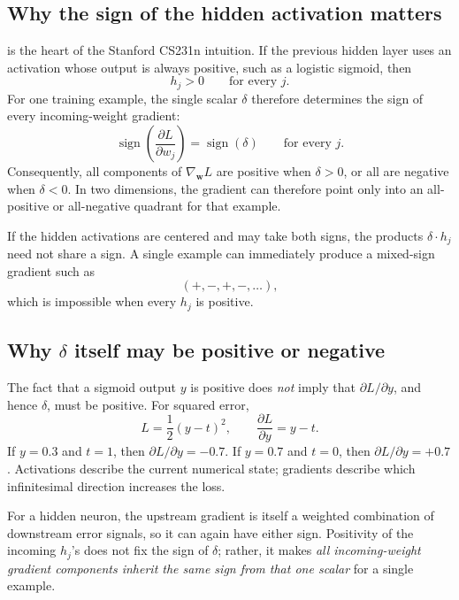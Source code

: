 \documentclass[11pt]{article}
\begin{document}
\subsection{Why the sign of the hidden activation matters}

 is the heart of the Stanford CS231n intuition.  If the previous hidden layer uses an activation whose output is always positive, such as a logistic sigmoid, then
\[
  h_j>0 \qquad \text{for every }j.
\]
For one training example, the single scalar \(\delta\) therefore determines the sign of every incoming-weight gradient:
\begin{equation}
  \operatorname{sign}\!\left(\frac{\partial L}{\partial w_j}\right)
  =\operatorname{sign}(\delta)
  \qquad \text{for every }j.
  \label{eq:samesign}
\end{equation}
Consequently, all components of \(\nabla_{\mathbf w}L\) are positive when \(\delta>0\), or all are negative when \(\delta<0\).  In two dimensions, the gradient can therefore point only into an all-positive or all-negative quadrant for that example.

If the hidden activations are centered and may take both signs, the products \(\delta\cdot h_j\) need not share a sign.  A single example can immediately produce a mixed-sign gradient such as
\[
  (+,-,+,-,\ldots),
\]
which is impossible when every \(h_j\) is positive.

\subsection{Why \texorpdfstring{\(\delta\)}{delta} itself may be positive or negative}

The fact that a sigmoid output \(y\) is positive does \emph{not} imply that \(\partial L/\partial y\), and hence \(\delta\), must be positive.  For squared error,
\[
  L=\frac12(y-t)^2,
  \qquad
  \frac{\partial L}{\partial y}=y-t.
\]
If \(y=0.3\) and \(t=1\), then \(\partial L/\partial y=-0.7\).  If \(y=0.7\) and \(t=0\), then \(\partial L/\partial y=+0.7\).  Activations describe the current numerical state; gradients describe which infinitesimal direction increases the loss.

For a hidden neuron, the upstream gradient is itself a weighted combination of downstream error signals, so it can again have either sign.  Positivity of the incoming \(h_j\)'s does not fix the sign of \(\delta\); rather, it makes \emph{all incoming-weight gradient components inherit the same sign from that one scalar} for a single example.
\end{document}
